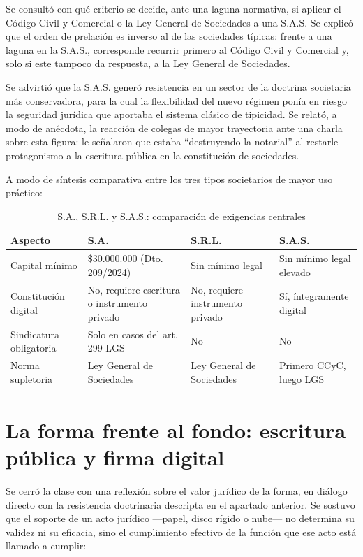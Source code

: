 \documentclass[12pt,oneside]{book}
\begin{document}
\begin{note}
Se consultó con qué criterio se decide, ante una laguna normativa, si aplicar el Código Civil y Comercial o la Ley General de Sociedades a una S.A.S. Se explicó que el orden de prelación es inverso al de las sociedades típicas: frente a una laguna en la S.A.S., corresponde recurrir primero al Código Civil y Comercial y, solo si este tampoco da respuesta, a la Ley General de Sociedades.
\end{note}

Se advirtió que la S.A.S. generó resistencia en un sector de la doctrina societaria más conservadora, para la cual la flexibilidad del nuevo régimen ponía en riesgo la seguridad jurídica que aportaba el sistema clásico de tipicidad. Se relató, a modo de anécdota, la reacción de colegas de mayor trayectoria ante una charla sobre esta figura: le señalaron que estaba ``destruyendo la notarial'' al restarle protagonismo a la escritura pública en la constitución de sociedades.

A modo de síntesis comparativa entre los tres tipos societarios de mayor uso práctico:

\begin{table}[H]
\centering
\caption{S.A., S.R.L. y S.A.S.: comparación de exigencias centrales}
\begin{tabularx}{\textwidth}{>{\raggedright\arraybackslash}p{}XXX}
\toprule
\textbf{Aspecto} & \textbf{S.A.} & \textbf{S.R.L.} & \textbf{S.A.S.} \\
\midrule
Capital mínimo & \$30.000.000 (Dto. 209/2024) & Sin mínimo legal & Sin mínimo legal elevado \\
Constitución digital & No, requiere escritura o instrumento privado & No, requiere instrumento privado & Sí, íntegramente digital \\
Sindicatura obligatoria & Solo en casos del art. 299 LGS & No & No \\
Norma supletoria & Ley General de Sociedades & Ley General de Sociedades & Primero CCyC, luego LGS \\
\bottomrule
\end{tabularx}
\end{table}

\section{La forma frente al fondo: escritura pública y firma digital}

Se cerró la clase con una reflexión sobre el valor jurídico de la forma, en diálogo directo con la resistencia doctrinaria descripta en el apartado anterior. Se sostuvo que el soporte de un acto jurídico —papel, disco rígido o nube— no determina su validez ni su eficacia, sino el cumplimiento efectivo de la función que ese acto está llamado a cumplir:
\end{document}
